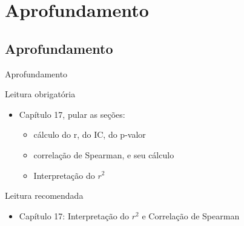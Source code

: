 \documentclass{beamer}
\begin{document}
\section{Aprofundamento}

\subsection{Aprofundamento}

\begin{frame}{\scriptsize Aprofundamento}
  \begin{block}{Leitura obrigatória}
    \footnotesize
    \begin{itemize}
      \footnotesize
    \item Capítulo 17, pular as seções:
      \begin{itemize}
        \scriptsize
      \item cálculo do r, do IC, do p-valor
      \item correlação de Spearman, e seu cálculo
      \item Interpretação do $r^2$
      \end{itemize}
    \end{itemize}
  \end{block}
  \begin{block}{Leitura recomendada}
    \begin{itemize}
      \scriptsize
    \item Capítulo 17: Interpretação do $r^2$ e Correlação de Spearman
    \end{itemize}
  \end{block}
\end{frame}
\end{document}
